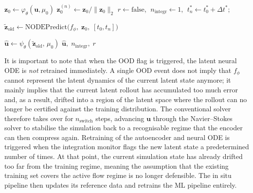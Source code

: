 \begin{algorithm}[htbp]
\SetAlgoLined
\DontPrintSemicolon
\caption{KNN-OOD-gated latent rollout (\texttt{predict\_flex})}
\label{alg: predict_flex}

$\mathbf{z}_0 \gets \varphi_\theta(\mathbf{u}, \mu_0)$\;
$\mathbf{z}_0^{(n)} \gets \mathbf{z}_0 / \|\mathbf{z}_0\|_2$\;
$r \gets \text{false}$, $\; n_\text{integr} \gets 1$, $\; t^*_n \gets t^*_0 + \Delta t^*$;

$\tilde{\mathbf{z}}_\text{old} \gets \text{NODEPredict}\bigl(f_\phi,\; \mathbf{z}_0,\; [t_0, t_n]\bigr)$\;

$\hat{\mathbf{u}} \gets \psi_\theta(\tilde{\mathbf{z}}_\text{old},\, \mu_0)$\;
\Return $\hat{\mathbf{u}},\; n_\text{integr},\; r$
\end{algorithm}


It is important to note that when the OOD flag is triggered, the latent neural ODE is \emph{not} retrained immediately. A single OOD event does not imply that $f_\phi$ cannot represent the latent dynamics of the current latent state anymore; it mainly implies that the current latent rollout has accumulated too much error and, as a result, drifted into a region of the latent space where the rollout can no longer be certified against the training distribution.  The conventional solver therefore takes over for $n_\text{switch}$ steps, advancing $\mathbf{u}$ through the Navier--Stokes solver to stabilise the simulation back to a recognisable regime that the encoder can then compress again. Retraining of the autoencoder and neural ODE is triggered when the integration monitor flags the new latent state a predetermined number of times. At that point, the current simulation state has already drifted too far from the training regime, meaning the assumption that the existing training set covers the active flow regime is no longer defensible. The in situ pipeline then updates its reference data and retrains the ML pipeline entirely. 


